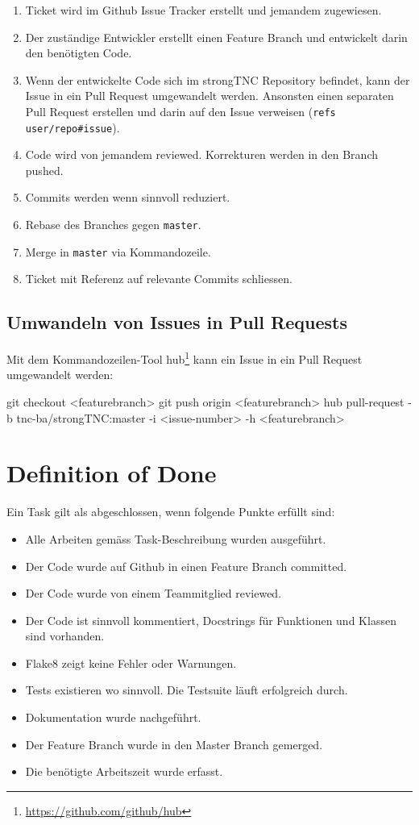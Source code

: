 \begin{enumerate}
	\item Ticket wird im Github Issue Tracker erstellt und jemandem zugewiesen.
	\item Der zuständige Entwickler erstellt einen Feature Branch und entwickelt
		darin den benötigten Code.
	\item Wenn der entwickelte Code sich im strongTNC Repository befindet, kann
		der Issue in ein Pull Request umgewandelt werden. Ansonsten einen separaten
		Pull Request erstellen und darin auf den Issue verweisen (\texttt{refs
		user/repo\#issue}).
	\item Code wird von jemandem reviewed. Korrekturen werden in den Branch
		pushed.
	\item Commits werden wenn sinnvoll reduziert.
	\item Rebase des Branches gegen \texttt{master}.
	\item Merge in \texttt{master} via Kommandozeile.
	\item Ticket mit Referenz auf relevante Commits schliessen.
\end{enumerate}

\subsection{Umwandeln von Issues in Pull Requests}

Mit dem Kommandozeilen-Tool hub\footnote{\url{https://github.com/github/hub}}
kann ein Issue in ein Pull Request umgewandelt werden:

\begin{bashcode}
git checkout <featurebranch>
git push origin <featurebranch>
hub pull-request -b tnc-ba/strongTNC:master -i <issue-number> -h <featurebranch>
\end{bashcode}


\section{Definition of Done}

Ein Task gilt als abgeschlossen, wenn folgende Punkte erfüllt sind:

\begin{itemize}
	\item Alle Arbeiten gemäss Task-Beschreibung wurden ausgeführt.
	\item Der Code wurde auf Github in einen Feature Branch committed.
	\item Der Code wurde von einem Teammitglied reviewed.
	\item Der Code ist sinnvoll kommentiert, Docstrings für Funktionen und Klassen sind vorhanden.
	\item Flake8 zeigt keine Fehler oder Warnungen.
	\item Tests existieren wo sinnvoll. Die Testsuite läuft erfolgreich durch.
	\item Dokumentation wurde nachgeführt.
	\item Der Feature Branch wurde in den Master Branch gemerged.
	\item Die benötigte Arbeitszeit wurde erfasst.
\end{itemize}


